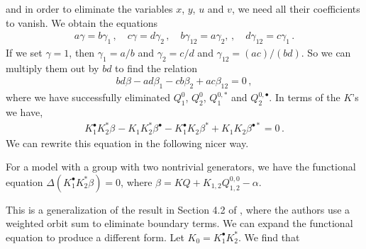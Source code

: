 and in order to eliminate the variables $x$, $y$, $u$ and $v$, we need all their coefficients to vanish. We obtain the equations
\begin{align}
	a\gamma = b\gamma_1\,,\quad c\gamma = d\gamma_2\,, \quad b\gamma_{12} = a \gamma_2,\,,\quad d\gamma_{12} = c\gamma_1\,.
\end{align}
If we set $\gamma = 1$, then $\gamma_1 = a/b$ and $\gamma_2 = c/d$ and $\gamma_{12} = (ac)/(bd)$. So we can multiply them out by $bd$ to find the relation
\begin{align}
	bd\beta-ad\beta_1-cb \beta_2 + ac \beta_{12} = 0\,,
\end{align}
where we have successfully eliminated $Q_1^0$, $Q_2^0$, $Q_1^{0,\ast}$ and $  Q_2^{0,\bullet}$. In terms of the $K$'s we have,
\begin{align}
	K_1^{\bullet}K_2^{\ast}\beta^{}-K_1^{}K_2^{\ast}\beta^{\bullet}-K_1^{\bullet}K_2^{}\beta^{\ast} + K_1^{}K_2^{}\beta^{\bullet\ast} = 0\,.
\end{align}
We can rewrite this equation in the following nicer way.
\begin{thm}For a \twoD \highSym model with a group with two nontrivial generators, we have the functional equation $\Delta(K_1^\bullet K_2^\ast \beta) = 0$, where $\beta = KQ + K_{1,2}Q_{1,2}^{0,0} -\alpha$.
\end{thm}
This is a generalization of the result in Section 4.2 of \cite[p.~16]{wong2014confining}, where the authors use a weighted orbit sum to eliminate boundary terms. We can expand the functional equation to produce a different form. Let $K_0 = K_1^\bullet K_2^\ast$. We find that

